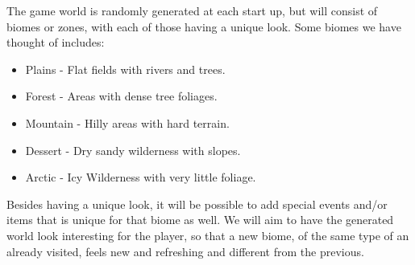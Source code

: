 The game world is randomly generated at each start up, but will consist of biomes or zones, with each of those having a unique look. Some biomes we have thought of includes:

\begin{itemize}
	\item Plains - Flat fields with rivers and trees.
	\item Forest - Areas with dense tree foliages.
	\item Mountain - Hilly areas with hard terrain.
	\item Dessert - Dry sandy wilderness with slopes.
	\item Arctic - Icy Wilderness with very little foliage.
\end{itemize}

Besides having a unique look, it will be possible to add special events and/or items that is unique for that biome as well. We will aim to have the generated world look interesting for the player, so that a new biome, of the same type of an already visited, feels new and refreshing and different from the previous.